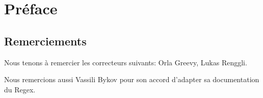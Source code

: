 \documentclass[a4paper,10pt,twoside]{book}
\begin{document}
	\sloppy
	\frontmatter
\fi
\chapter{Préface}


\section*{Remerciements}






Nous tenons à remercier les correcteurs suivants: 
Orla Greevy,
Lukas Renggli.

Nous remercions aussi 
Vassili Bykov 
pour son accord d'adapter sa documentation du \framework Regex.

\ifx\wholebook\relax\else
   
   
\end{document}
